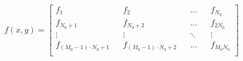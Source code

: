 \documentclass[../main.tex]{subfiles}%
\begin{document}
%
    \Xequation%
    \begin{equation}%
        f(x,y)%
        =%
        \begin{bmatrix}%
            f_{1} && f_{2} && \dots && f_{N_{0}} \\%
            f_{N_0+1} && f_{N_0+2} && \dots && f_{2N_0} \\%
            \vdots && \vdots && \ddots && \vdots \\%
            f_{(M_{0}-1)\cdot N_{0}+1} && f_{(M_{0}-1)\cdot N_{0}+2}  && \dots && f_{M_{0}N_{0}} \\%
        \end{bmatrix}%
        \label{eq:super-sampling-pixel-index}%
    \end{equation}%
\end{document}
